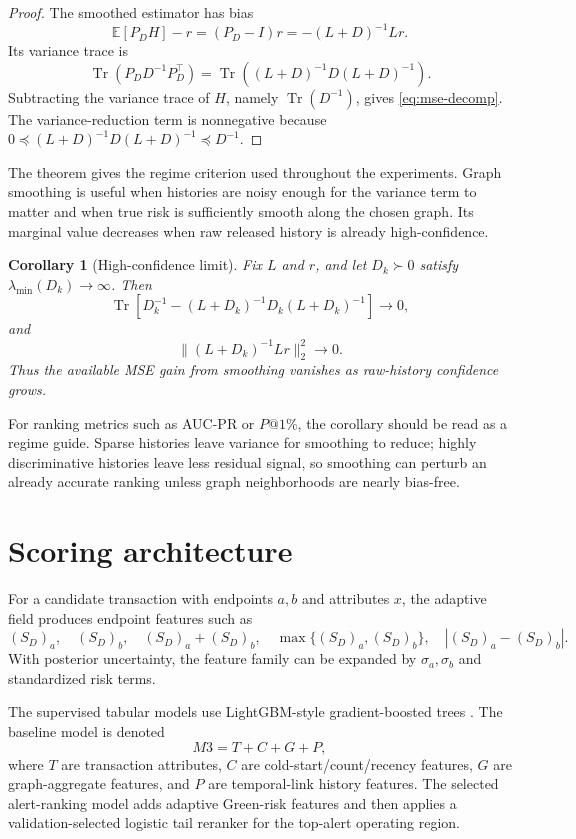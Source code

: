 \documentclass[11pt]{article}
\newtheorem{corollary}[theorem]{Corollary}
\theoremstyle{definition}
\theoremstyle{remark}
\newcommand{\E}{\mathbb{E}}
\newcommand{\Tr}{\operatorname{Tr}}
\newcommand{\SD}{S_D}
\begin{document}
\begin{proof}
The smoothed estimator has bias
\[
    \E[P_DH]-r=(P_D-I)r=-(L+D)^{-1}Lr.
\]
Its variance trace is
\[
    \Tr(P_DD^{-1}P_D^\top)=\Tr((L+D)^{-1}D(L+D)^{-1}).
\]
Subtracting the variance trace of $H$, namely $\Tr(D^{-1})$, gives \eqref{eq:mse-decomp}. The variance-reduction term is nonnegative because $0\preceq (L+D)^{-1}D(L+D)^{-1}\preceq D^{-1}$.
\end{proof}

The theorem gives the regime criterion used throughout the experiments. Graph smoothing is useful when histories are noisy enough for the variance term to matter and when true risk is sufficiently smooth along the chosen graph. Its marginal value decreases when raw released history is already high-confidence.

\begin{corollary}[High-confidence limit]
\label{cor:high-confidence}
Fix $L$ and $r$, and let $D_k\succ0$ satisfy $\lambda_{\min}(D_k)\to\infty$. Then
\[
    \Tr\left[D_k^{-1}-(L+D_k)^{-1}D_k(L+D_k)^{-1}\right]\to 0,
\]
and
\[
    \|(L+D_k)^{-1}Lr\|_2^2\to 0.
\]
Thus the available MSE gain from smoothing vanishes as raw-history confidence grows.
\end{corollary}

For ranking metrics such as AUC-PR or $P@1\%$, the corollary should be read as a regime guide. Sparse histories leave variance for smoothing to reduce; highly discriminative histories leave less residual signal, so smoothing can perturb an already accurate ranking unless graph neighborhoods are nearly bias-free.

\section{Scoring architecture}
\label{sec:architecture}

For a candidate transaction with endpoints $a,b$ and attributes $x$, the adaptive field produces endpoint features such as
\[
    (\SD)_a,
    \quad
    (\SD)_b,
    \quad
    (\SD)_a+(\SD)_b,
    \quad
    \max\{(\SD)_a,(\SD)_b\},
    \quad
    |(\SD)_a-(\SD)_b|.
\]
With posterior uncertainty, the feature family can be expanded by $\sigma_a,\sigma_b$ and standardized risk terms.

The supervised tabular models use LightGBM-style gradient-boosted trees \cite{ke2017lightgbm}. The baseline model is denoted
\[
    M3=T+C+G+P,
\]
where $T$ are transaction attributes, $C$ are cold-start/count/recency features, $G$ are graph-aggregate features, and $P$ are temporal-link history features. The selected alert-ranking model adds adaptive Green-risk features and then applies a validation-selected logistic tail reranker for the top-alert operating region.
\end{document}
